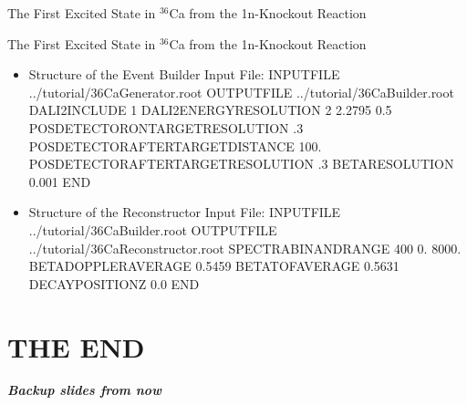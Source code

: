 \documentclass[
  style=pd,
  clock
]{powerdot}
\begin{document}
\begin{CJK}{UTF8}{min}
\begin{slide}{The First Excited State in $^{36}$Ca from the 1n-Knockout Reaction}
\end{slide}

\begin{slide}[toc=,bm=]{The First Excited State in $^{36}$Ca from the 1n-Knockout Reaction}
\begin{itemize}
\item Structure of the Event Builder Input File:\linebreak 
  {\ttfamily \scriptsize
    INPUTFILE ../tutorial/36CaGenerator.root\linebreak
    OUTPUTFILE ../tutorial/36CaBuilder.root\linebreak
    DALI2INCLUDE 1\linebreak
    DALI2ENERGYRESOLUTION 2 2.2795 0.5\linebreak
    POSDETECTORONTARGETRESOLUTION .3\linebreak
    POSDETECTORAFTERTARGETDISTANCE 100.\linebreak
    POSDETECTORAFTERTARGETRESOLUTION .3\linebreak
    BETARESOLUTION 0.001\linebreak
    END
  }
\item Structure of the Reconstructor Input File:\linebreak
  {\ttfamily \small  \scriptsize
    INPUTFILE ../tutorial/36CaBuilder.root\linebreak
    OUTPUTFILE ../tutorial/36CaReconstructor.root\linebreak
    SPECTRABINANDRANGE 400 0. 8000.\linebreak
    BETADOPPLERAVERAGE 0.5459\linebreak
    BETATOFAVERAGE 0.5631\linebreak
    DECAYPOSITIONZ 0.0\linebreak
    END
  }
\end{itemize}
\end{slide}


\section[toc=,bm=---]{THE END}


\begin{slide}[toc=,bm=]{}
  \begin{center}
    {\bf \textit{\Huge Backup slides from now}}
  \end{center}
\end{slide}

\end{CJK}
\end{document}
